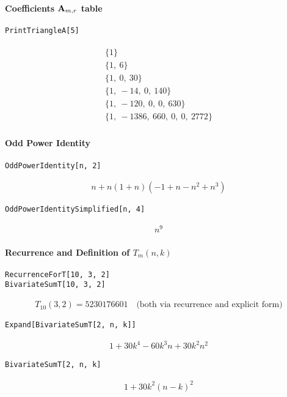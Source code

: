 \paragraph{Coefficients \texorpdfstring{${\mathbf{A}} \sb{m,r}$}{A(m,r)} table}
\begin{verbatim}
PrintTriangleA[5]
\end{verbatim}
\begin{align*}
    \begin{array}{l}
        \{1\} \\
        \{1,\ 6\} \\
        \{1,\ 0,\ 30\} \\
        \{1,\ -14,\ 0,\ 140\} \\
        \{1,\ -120,\ 0,\ 0,\ 630\} \\
        \{1,\ -1386,\ 660,\ 0,\ 0,\ 2772\}
    \end{array}
\end{align*}

\paragraph{Odd Power Identity}
\begin{verbatim}
OddPowerIdentity[n, 2]
\end{verbatim}
\begin{align*}
    n + n(1 + n)(-1 + n - n^2 + n^3)
\end{align*}
\begin{verbatim}
OddPowerIdentitySimplified[n, 4]
\end{verbatim}
\begin{align*}
    n^9
\end{align*}

\paragraph{Recurrence and Definition of \texorpdfstring{$T_m(n,k)$}{Tm(n,k)}}
\begin{verbatim}
RecurrenceForT[10, 3, 2]
BivariateSumT[10, 3, 2]
\end{verbatim}
\begin{align*}
    T_{10}(3,2) = 5230176601 \quad \text{(both via recurrence and explicit form)}
\end{align*}
\begin{verbatim}
Expand[BivariateSumT[2, n, k]]
\end{verbatim}
\begin{align*}
    1 + 30k^4 - 60k^3 n + 30k^2 n^2
\end{align*}
\begin{verbatim}
BivariateSumT[2, n, k]
\end{verbatim}
\begin{align*}
    1 + 30k^2(n-k)^2
\end{align*}

